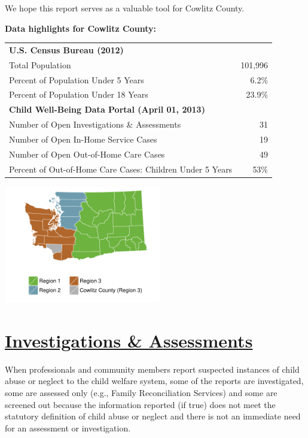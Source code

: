 \documentclass{article}\usepackage[]{graphicx}\usepackage[]{color}
\begin{document}
We hope this report serves as a valuable tool for  Cowlitz County.

\begin{minipage}{0.6\textwidth}
\textbf{Data highlights for Cowlitz County:}

\begin{tabular}{lr}
  \toprule
 \textbf{U.S. Census Bureau (2012)} &  \\ 
  \quad Total Population & 101,996 \\ 
  \quad Percent of Population Under 5 Years & 6.2\% \\ 
  \quad Percent of Population Under 18 Years & 23.9\% \\ 
  \textbf{Child Well-Being Data Portal (April 01, 2013)} &  \\ 
  \quad Number of Open Investigations \& Assessments & 31 \\ 
  \quad Number of Open In-Home Service Cases & 19 \\ 
  \quad Number of Open Out-of-Home Care Cases & 49 \\ 
  \quad Percent of Out-of-Home Care Cases: Children Under 5 Years & 53\% \\ 
   \bottomrule
\end{tabular}



\end{minipage}
\begin{minipage}{0.4\textwidth}

\begin{center}
\includegraphics[width=2.7in]{county_maps/Cowlitz-b}
\end{center}

\end{minipage}


\newpage
\restoregeometry
\section{\href{http://www.partnersforourchildren.org//child-well-being/visualizations/investigations-assessments/trends}
{Investigations \& Assessments}}
When professionals and community members report suspected instances of child abuse or neglect to the child welfare system, some of the reports are investigated, some are assessed only (e.g., Family Reconciliation Services) and some are screened out because the information reported (if true) does not meet the statutory definition of child abuse or neglect and there is not an immediate need for an assessment or investigation.\\[6pt]
\label{p:ia}
\end{document}
